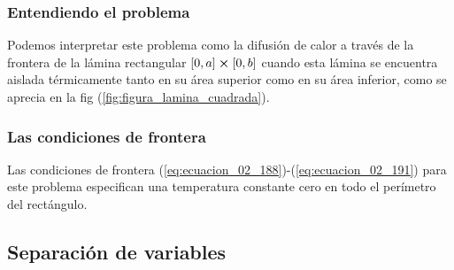 \documentclass[12pt]{beamer}
\begin{document}
\begin{frame}
\frametitle{Entendiendo el problema}
Podemos interpretar este problema como la difusión de calor a través de la frontera de la lámina rectangular $[ 0, a ] \cp [ 0, b ]$ cuando esta lámina se encuentra aislada térmicamente tanto en su área superior como en su área inferior, como se aprecia en la fig (\ref{fig:figura_lamina_cuadrada}).
\end{frame}
\begin{frame}
\frametitle{Las condiciones de frontera}
Las condiciones de frontera (\ref{eq:ecuacion_02_188})-(\ref{eq:ecuacion_02_191}) para este problema especifican una temperatura constante cero en todo el perímetro del rectángulo.
\end{frame}

\subsection{Separación de variables}
\end{document}

